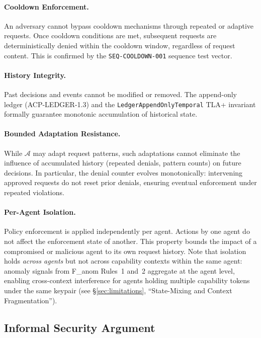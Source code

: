 \documentclass[11pt]{article}
\theoremstyle{definition}
\begin{document}
\paragraph{Cooldown Enforcement.}
An adversary cannot bypass cooldown mechanisms through repeated or adaptive requests.
Once cooldown conditions are met, subsequent requests are deterministically denied within
the cooldown window, regardless of request content.
This is confirmed by the \texttt{SEQ-COOLDOWN-001} sequence test vector.

\paragraph{History Integrity.}
Past decisions and events cannot be modified or removed.
The append-only ledger (ACP-LEDGER-1.3) and the \texttt{LedgerAppendOnlyTemporal} TLA+ invariant
formally guarantee monotonic accumulation of historical state.

\paragraph{Bounded Adaptation Resistance.}
While $\mathcal{A}$ may adapt request patterns, such adaptations cannot eliminate the influence
of accumulated history (repeated denials, pattern counts) on future decisions.
In particular, the denial counter evolves monotonically: intervening approved requests
do not reset prior denials, ensuring eventual enforcement under repeated violations.

\paragraph{Per-Agent Isolation.}
Policy enforcement is applied independently per agent.
Actions by one agent do not affect the enforcement state of another.
This property bounds the impact of a compromised or malicious agent to its own
request history.
Note that isolation holds \emph{across agents} but not across capability contexts
within the same agent: anomaly signals from F\_anom Rules~1 and~2 aggregate
at the agent level, enabling cross-context interference for agents holding
multiple capability tokens under the same keypair
(see \S\ref{sec:limitations}, ``State-Mixing and Context Fragmentation'').

\subsection{Informal Security Argument}
\end{document}
